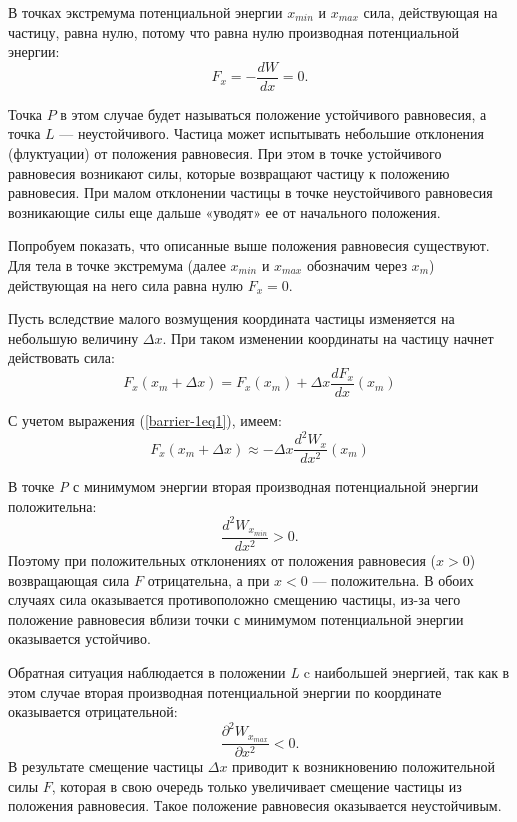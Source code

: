 \documentclass[14pt,a4paper,oneside]{extarticle}	%
\begin{document}
В точках экстремума потенциальной энергии $ x_{min} $ и $ x_{max} $ сила, действующая на частицу, равна нулю, потому что равна нулю производная потенциальной энергии:
\begin{equation}\label{barrier-1eq1}
F_{x} = -\frac{d W}{d x} = 0.
\end{equation}

Точка $ P $ в этом случае будет называться положение устойчивого равновесия, а точка $ L $ — неустойчивого. 
Частица может испытывать небольшие отклонения (флуктуации) от положения равновесия.
При этом в точке устойчивого равновесия возникают силы, которые возвращают частицу к положению равновесия. 
При малом отклонении частицы в точке неустойчивого равновесия возникающие силы еще дальше «уводят» ее от начального положения.

Попробуем показать, что описанные выше положения равновесия существуют.
Для тела в точке экстремума (далее $ x_{min} $ и $ x_{max} $ обозначим через $ x_{m} $) действующая на него сила равна нулю $ F_{x} = 0 $.

Пусть вследствие малого возмущения координата частицы изменяется на небольшую величину $ \Delta x $. 
При таком изменении координаты на частицу начнет действовать сила:
\begin{equation}\label{barrier-1eq2}
F_{x}(x_{m} + \Delta x) = F_{x}(x_{m}) + \Delta x \frac{d F_{x}}{d x}(x_{m})
\end{equation}

С учетом выражения (\ref{barrier-1eq1}), имеем:
\begin{equation}\label{barrier-1eq3}
F_{x}(x_{m} + \Delta x) \approx - \Delta x \frac{d^{2} W_{x}}{d x^{2}}(x_{m})
\end{equation}

В точке \textit{P} с минимумом энергии вторая производная потенциальной энергии положительна: $$ \frac{d^{2} W_{x_{min}}}{d x^{2}} > 0.$$
Поэтому при положительных отклонениях от положения равновесия ($ x > 0 $) возвращающая сила $ F $ отрицательна, а при $ x<0 $ — положительна.
В обоих случаях сила оказывается противоположно смещению частицы, из-за чего положение равновесия вблизи точки с минимумом потенциальной энергии оказывается устойчиво.

Обратная ситуация наблюдается в положении \textit{L} c наибольшей энергией, так как в этом случае вторая производная потенциальной энергии по координате оказывается отрицательной: $$ \frac{\partial^{2} W_{x_{max}}}{\partial x^{2}} < 0. $$ 
В результате смещение частицы  $ \Delta x $ приводит к возникновению положительной силы $ F $, которая в свою очередь только увеличивает смещение частицы из положения равновесия. 
Такое положение равновесия оказывается неустойчивым.
\end{document}
